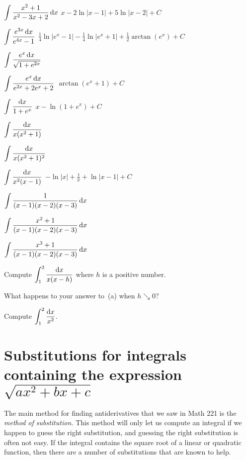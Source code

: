 \begin{multicols}{2}
\problem $\displaystyle \int \frac{x^2+1}{x^2-3x+2}\,\mathrm{d} x$ %
\answer %
$x - 2\ln|x-1|+5\ln|x-2| + C$
\endanswer

\problem $\displaystyle \int \frac{e^{3x}\,\mathrm{d} x}{e^{4x}-1}$ %
\answer %
$\frac14\ln|e^x-1|-\frac14\ln|e^x+1|+\frac12\arctan(e^x)+C$
\endanswer

\problem $\displaystyle \int \frac{e^x\,\mathrm{d} x}{\sqrt{1+e^{2x} }}$ %

\problem $\displaystyle \int \frac{e^x\,\mathrm{d} x}{e^{2x}+2e^x+2}$ %
\answer %
$\arctan(e^x+1)+C$
\endanswer

\problem $\displaystyle \int \frac{\mathrm{d} x}{1+e^{x}}$ %
\answer %
$x-\ln(1+e^x)+C$
\endanswer

\problem $\displaystyle \int \frac{\mathrm{d} x}{x(x^2+1)}$ %

\problem $\displaystyle \int \frac{\mathrm{d} x}{x(x^2+1)^2}$ %

\problem $\displaystyle \int \frac{\mathrm{d} x}{x^2(x-1)}$ %
\answer %
$-\ln|x|+\frac1x+\ln|x-1|+C$
\endanswer

\problem $\displaystyle \int \frac{1}{(x-1)(x-2)(x-3)}\,\mathrm{d} x$ %

\problem $\displaystyle \int \frac{x^2+1}{(x-1)(x-2)(x-3)}\,\mathrm{d} x$ %

\problem $\displaystyle \int \frac{x^3+1}{(x-1)(x-2)(x-3)}\,\mathrm{d} x$ %


\problem \subprob Compute $\displaystyle\int_1^2 \frac{\mathrm{d} x}{x(x-h)}$ where $h$ is a positive number. %

\subprob What happens to your answer to~(a) when $h \searrow 0$?

\subprob Compute $\displaystyle\int_1^2 \frac{\mathrm{d} x}{x^2}$.

\end{multicols}
\noproblemfont
\section{Substitutions for integrals containing the expression %
  $\sqrt{ax^2+bx+c}$}

The main method for finding antiderivatives that we saw in Math 221 is the
\textit{method of substitution. }  This method will only let us compute an
integral if we happen to guess the right substitution, and guessing the right
substitution is often not easy.  If the integral contains the square root of a
linear or quadratic function, then there are a number of substitutions that are
known to help.

